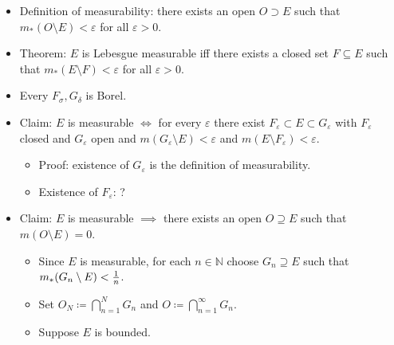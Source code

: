 \begin{concept}

\envlist

\begin{itemize}
\tightlist
\item
  Definition of measurability: there exists an open \(O\supset E\) such
  that \(m_*(O\setminus E) < {\varepsilon}\) for all
  \({\varepsilon}> 0\).
\item
  Theorem: \(E\) is Lebesgue measurable iff there exists a closed set
  \(F\subseteq E\) such that \(m_*(E\setminus F) < {\varepsilon}\) for
  all \({\varepsilon}>0\).
\item
  Every \(F_\sigma, G_\delta\) is Borel.
\item
  Claim: \(E\) is measurable \(\iff\) for every \(\varepsilon\) there
  exist \(F_\varepsilon \subset E \subset G_\varepsilon\) with
  \(F_\varepsilon\) closed and \(G_\varepsilon\) open and
  \(m(G_\varepsilon \setminus E)< \varepsilon\) and
  \(m(E\setminus F_\varepsilon) < \varepsilon\).

  \begin{itemize}
  \tightlist
  \item
    Proof: existence of \(G_{\varepsilon}\) is the definition of
    measurability.
  \item
    Existence of \(F_{\varepsilon}\): ?
  \end{itemize}
\item
  Claim: \(E\) is measurable \(\implies\) there exists an open
  \(O\supseteq E\) such that \(m(O\setminus E) = 0\).

  \begin{itemize}
  \tightlist
  \item
    Since \(E\) is measurable, for each \(n\in {\mathbb{N}}\) choose
    \(G_n \supseteq E\) such that \(m_*(G_n\setminus E) < {1\over n}\).
  \item
    Set \(O_N \coloneqq\displaystyle\bigcap_{n=1}^N G_n\) and
    \(O\coloneqq\displaystyle\bigcap_{n=1}^\infty G_n\).
  \item
    Suppose \(E\) is bounded.


\end{itemize}
\end{itemize}
\end{concept}

